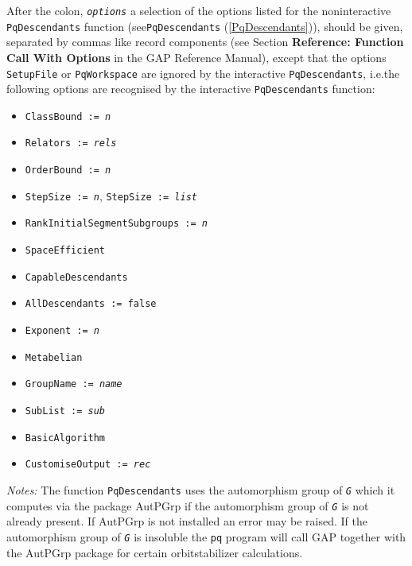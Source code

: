 \documentclass[a4paper,11pt]{report}
\begin{document}
{{{ After the colon, \mbox{\texttt{\mdseries\slshape options}} a selection of the options listed for the non\texttt{}interactive \texttt{PqDescendants} function (see{\nobreakspace}\texttt{PqDescendants} (\ref{PqDescendants})), should be given, separated by commas like record components (see
Section{\nobreakspace} \textbf{Reference: Function Call With Options} in the \textsf{GAP} Reference Manual), except that the options \texttt{SetupFile} or \texttt{PqWorkspace} are ignored by the interactive \texttt{PqDescendants}, i.e.{\nobreakspace}the following options are recognised by the interactive \texttt{PqDescendants} function: 
\begin{itemize}
\item  \texttt{ClassBound := \mbox{\texttt{\mdseries\slshape n}}} 
\item  \texttt{Relators := \mbox{\texttt{\mdseries\slshape rels}}} 
\item  \texttt{OrderBound := \mbox{\texttt{\mdseries\slshape n}}} 
\item  \texttt{StepSize := \mbox{\texttt{\mdseries\slshape n}}}, \texttt{StepSize := \mbox{\texttt{\mdseries\slshape list}}}  
\item  \texttt{RankInitialSegmentSubgroups := \mbox{\texttt{\mdseries\slshape n}}} 
\item  \texttt{SpaceEfficient} 
\item  \texttt{CapableDescendants} 
\item  \texttt{AllDescendants := false} 
\item  \texttt{Exponent := \mbox{\texttt{\mdseries\slshape n}}} 
\item  \texttt{Metabelian} 
\item  \texttt{GroupName := \mbox{\texttt{\mdseries\slshape name}}} 
\item  \texttt{SubList := \mbox{\texttt{\mdseries\slshape sub}}} 
\item  \texttt{BasicAlgorithm} 
\item  \texttt{CustomiseOutput := \mbox{\texttt{\mdseries\slshape rec}}} 
\end{itemize}
 \emph{Notes:} The function \texttt{PqDescendants} uses the automorphism group of \mbox{\texttt{\mdseries\slshape G}} which it computes via the package \textsf{AutPGrp} if the automorphism group of \mbox{\texttt{\mdseries\slshape G}} is not already present. If \textsf{AutPGrp} is not installed an error may be raised. If the automorphism group of \mbox{\texttt{\mdseries\slshape G}} is insoluble the \texttt{pq} program will call \textsf{GAP} together with the \textsf{AutPGrp} package for certain orbit\texttt{}stabilizer calculations. 

}}}
\end{document}
